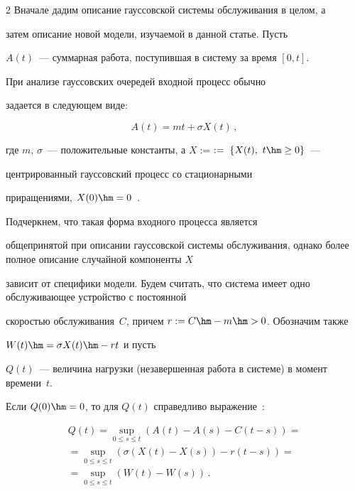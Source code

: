 \begin{multicols}{2}
Вначале дадим  описание гауссовской системы обслуживания в целом, а


затем описание новой модели, изучаемой  в данной статье. Пусть


$A(t)$~--- суммарная работа, поступившая в систему за время $[0,t]$.


При анализе  гауссовских очередей  входной процесс обычно


задается в следующем виде:


\begin{equation}


A(t)=mt+\sigma X(t)\,, 


\label{asymp-l1}


\end{equation}


где  $m$, $\sigma $~--- положительные константы, а  $X:=$\linebreak $:=\;\{X(t),\ t\hm\geq 0\}$~---  


центрированный гауссовский процесс со стационарными


приращениями,  $X(0)\hm=0$~\cite{Mandjes}.


 Подчеркнем, что такая форма входного процесса  является


 общепринятой при описании гауссовской системы обслуживания, однако более полное описание случайной компоненты  $X$


 зависит от специфики  модели.  Будем считать, что система имеет одно обслуживающее устройство с постоянной


скоростью обслуживания~$C$, причем $r:=C\hm-m\hm>0$. Обозначим также


$W(t)\hm=\sigma X(t)\hm-rt$ и пусть


 $Q(t)$~--- величина нагрузки (незавершенная работа в системе) в момент времени~$t$. 


 Если $Q(0)\hm=0$, то для $Q(t)$ справедливо выражение~\cite{Reich}:


 


 \noindent


\begin{multline}


Q(t)= \sup\limits_{0 \leq s \leq t}(A(t)-A(s)-C(t-s))={}\\


{}= \sup\limits_{0 \leq s \leq t}(\sigma(X(t)-X(s))-r(t-s))={}\\


{}=\sup\limits_{0 \leq s \leq t}(W(t)-W(s))\,.



\end{multline}
\end{multicols}
